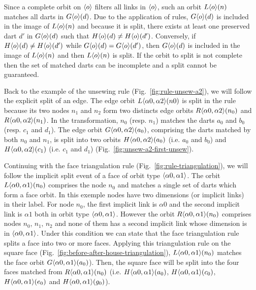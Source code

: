\documentclass[../main.tex]{subfiles}
\begin{document}
\begin{proofidea}\label{prfid:orbit-split} Since a complete orbit on $\langle o\rangle$
filters all links in $\langle o\rangle$, such an orbit $L\langle o\rangle(n)$ matches all
darts in $G\langle o\rangle(d)$. Due to the application of rules, $G\langle o\rangle(d)$ is
included in the image of $L\langle o\rangle(n)$ and because it is split, there exists
at least one preserved dart $d'$ in $G\langle o\rangle(d)$ such that
$H\langle o\rangle(d) \neq H\langle o\rangle(d')$. Conversely, if
$H\langle o\rangle(d) \neq H\langle o\rangle(d')$ while $G\langle o\rangle(d) = G\langle o\rangle(d')$, then
$G\langle o\rangle(d)$ is included in the image of $L\langle o\rangle(n)$ and then
$L\langle o\rangle(n)$ is split. If the orbit to split is not complete then the set of
matched darts can be incomplete and a split cannot be guaranteed.
\end{proofidea}

Back to the example of the unsewing rule (Fig.~\ref{fig:rule-unsew-a2}), we will
follow the explicit split of an edge. The edge orbit
$L\langle\alpha 0, \alpha 2\rangle(n0)$ is split in the rule because its two nodes
$n_{1}$ and $n_{2}$ form two distincts edge orbits
$R\langle\alpha 0, \alpha 2\rangle(n_{0})$ and $R\langle\alpha 0, \alpha 2\rangle(n_{1})$.
In the transformation, $n_{0}$ (resp. $n_{1}$) matches the darts $a_{0}$ and
$b_{0}$ (resp. $c_{1}$ and $d_{1}$). The edge orbit
$G\langle\alpha 0, \alpha 2\rangle(a_{0})$, comprising the darts matched by both
$n_{0}$ and $n_{1}$, is split into two orbits
$H\langle\alpha 0, \alpha 2\rangle(a_{0})$ (i.e. $a_{0}$ and $b_{0}$) and
$H\langle\alpha 0, \alpha 2\rangle(c_{1})$ (i.e. $c_{1}$ and $d_{1}$)
(Fig.~\ref{fig:unsew-a2-first-unsew}).

Continuing with the face triangulation rule (Fig.~\ref{fig:rule-triangulation}),
we will follow the implicit split event of a face of orbit type
$\langle\alpha 0, \alpha 1\rangle$. The orbit $L\langle\alpha 0, \alpha 1\rangle(n_{0})$
comprises the node $n_{0}$ and matches a single set of darts which form a face
orbit. In this exemple nodes have two dimensions (or implicit links) in their
label. For node $n_{0}$, the first implicit link is $\alpha 0$ and the second
implicit link is $\alpha 1$ both in orbit type $\langle\alpha 0, \alpha 1\rangle$.
However the orbit $R\langle\alpha 0, \alpha 1\rangle(n_{0})$ comprises nodes $n_{0}$,
$n_{1}$, $n_{2}$ and none of them has a second implicit link whose dimension is
in $\langle\alpha 0, \alpha 1\rangle$. Under this condition we can state that the face
triangulation rule splits a face into two or more faces. Applying this
triangulation rule on the square face
(Fig.~\ref{fig:before-after-house-triangulation}),
$L\langle\alpha 0, \alpha 1\rangle(n_{0})$ matches the face orbit
$G\langle\alpha 0, \alpha 1\rangle(a_{0})$). Then, the square face will be split into
the four faces matched from $R\langle\alpha 0, \alpha 1\rangle(n_{0})$ (i.e.
$H\langle\alpha 0, \alpha 1\rangle(a_{0})$, $H\langle\alpha 0, \alpha 1\rangle(c_{0})$,
$H\langle\alpha 0, \alpha 1\rangle(e_{0})$ and $H\langle\alpha 0, \alpha 1\rangle(g_{0})$).
\end{document}
